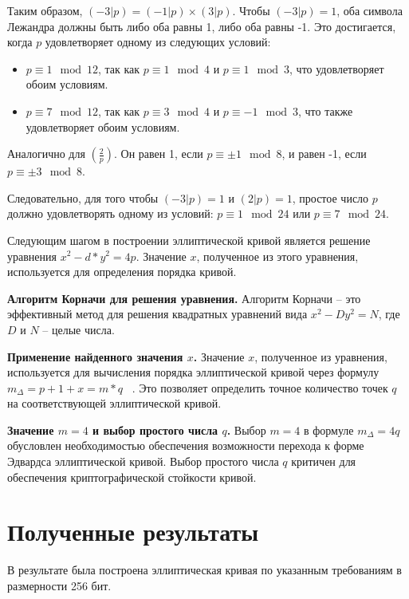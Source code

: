 Таким образом, \((-3|p) = (-1|p) \times (3|p)\). Чтобы \((-3|p) = 1\), оба символа Лежандра должны быть либо оба равны 1, либо оба равны -1. Это достигается, когда \( p \) удовлетворяет одному из следующих условий:
\begin{itemize}
    \item \( p \equiv 1 \mod 12 \), так как \( p \equiv 1 \mod 4 \) и \( p \equiv 1 \mod 3 \), что удовлетворяет обоим условиям.
    \item \( p \equiv 7 \mod 12 \), так как \( p \equiv 3 \mod 4 \) и \( p \equiv -1 \mod 3 \), что также удовлетворяет обоим условиям.
\end{itemize}

Аналогично для \(\left(\frac{2}{p}\right)\). Он равен 1, если \(p \equiv \pm 1 \mod 8\), и равен -1, если \(p \equiv \pm 3 \mod 8\).

Следовательно, для того чтобы \((-3|p) = 1\) и \((2|p) = 1\), простое число \(p\) должно удовлетворять одному из условий: \(p \equiv 1 \mod 24\) или \(p \equiv 7 \mod 24\).

Следующим шагом в построении эллиптической кривой является решение уравнения \( x^2 - d*y^2 = 4p \). Значение \( x \), полученное из этого уравнения, используется для определения порядка кривой.

\textbf{Алгоритм Корначи для решения уравнения.} Алгоритм Корначи – это эффективный метод для решения квадратных уравнений вида \( x^2 - Dy^2 = N \), где \( D \) и \( N \) – целые числа.~\cite{cohen-cornach}

\textbf{Применение найденного значения \( x \).} Значение \( x \), полученное из уравнения, используется для вычисления порядка эллиптической кривой через формулу \( m_{\Delta} = p + 1 + x =  m * q\) ~\cite{nesterenko-disser}. Это позволяет определить точное количество точек \( q \) на соответствующей эллиптической кривой.

\textbf{Значение \( m = 4 \) и выбор простого числа \( q \).} Выбор \( m = 4 \) в формуле \( m_{\Delta} = 4q \) обусловлен необходимостью обеспечения возможности перехода к форме Эдвардса эллиптической кривой. Выбор простого числа \( q \) критичен для обеспечения криптографической стойкости кривой.

\section*{Полученные результаты}
В результате была построена эллиптическая кривая по указанным требованиям в размерности 256 бит. 

